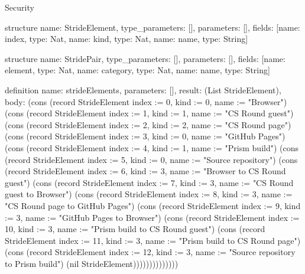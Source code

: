 \begin{lexlean}{Security}
\begin{semanticmodule}
structure{
  name: StrideElement,
  type_parameters: [],
  parameters: [],
  fields: [{name: index, type: Nat}, {name: kind, type: Nat}, {name: name, type: String}]
}

structure{
  name: StridePair,
  type_parameters: [],
  parameters: [],
  fields: [{name: element, type: Nat}, {name: category, type: Nat}, {name: name, type: String}]
}

definition{
  name: strideElements,
  parameters: [],
  result: (List StrideElement),
  body: (cons (record StrideElement {index := 0, kind := 0, name := "Browser"}) (cons (record StrideElement {index := 1, kind := 1, name := "CS Round guest"}) (cons (record StrideElement {index := 2, kind := 2, name := "CS Round page"}) (cons (record StrideElement {index := 3, kind := 0, name := "GitHub Pages"}) (cons (record StrideElement {index := 4, kind := 1, name := "Prism build"}) (cons (record StrideElement {index := 5, kind := 0, name := "Source repository"}) (cons (record StrideElement {index := 6, kind := 3, name := "Browser to CS Round guest"}) (cons (record StrideElement {index := 7, kind := 3, name := "CS Round guest to Browser"}) (cons (record StrideElement {index := 8, kind := 3, name := "CS Round page to GitHub Pages"}) (cons (record StrideElement {index := 9, kind := 3, name := "GitHub Pages to Browser"}) (cons (record StrideElement {index := 10, kind := 3, name := "Prism build to CS Round guest"}) (cons (record StrideElement {index := 11, kind := 3, name := "Prism build to CS Round page"}) (cons (record StrideElement {index := 12, kind := 3, name := "Source repository to Prism build"}) (nil StrideElement))))))))))))))
}


\end{semanticmodule}
\end{lexlean}
